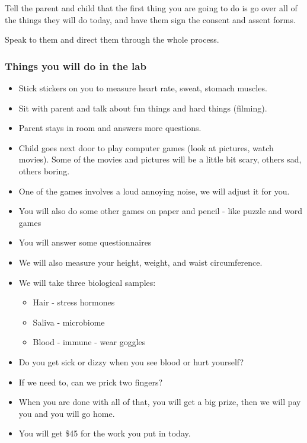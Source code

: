 \documentclass[
]{book}
\providecommand{\tightlist}{%
  \setlength{\itemsep}{0pt}\setlength{\parskip}{0pt}}
\begin{document}
Tell the parent and child that the first thing you are going to do is go over all of the things they will do today, and have them sign the consent and assent forms.

Speak to them and direct them through the whole process.

\hypertarget{things-you-will-do-in-the-lab}{%
\subsubsection{Things you will do in the lab}\label{things-you-will-do-in-the-lab}}

\begin{itemize}
\tightlist
\item
  Stick stickers on you to measure heart rate, sweat, stomach muscles.
\item
  Sit with parent and talk about fun things and hard things (filming).
\item
  Parent stays in room and answers more questions.
\item
  Child goes next door to play computer games (look at pictures, watch movies). Some of the movies and pictures will be a little bit scary, others sad, others boring.
\item
  One of the games involves a loud annoying noise, we will adjust it for you.
\item
  You will also do some other games on paper and pencil - like puzzle and word games
\item
  You will answer some questionnaires
\item
  We will also measure your height, weight, and waist circumference.
\item
  We will take three biological samples:

  \begin{itemize}
  \tightlist
  \item
    Hair - stress hormones
  \item
    Saliva - microbiome
  \item
    Blood - immune - wear goggles
  \end{itemize}
\item
  Do you get sick or dizzy when you see blood or hurt yourself?
\item
  If we need to, can we prick two fingers?
\item
  When you are done with all of that, you will get a big prize, then we will pay you and you will go home.
\item
  You will get \$45 for the work you put in today.
\end{itemize}
\end{document}
